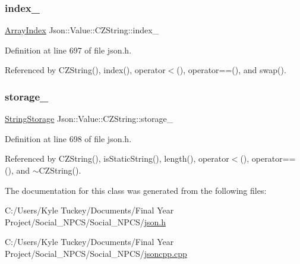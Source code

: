 \mbox{\label{class_json_1_1_value_1_1_c_z_string_aecf29982235c9c165a0971023ebbb270}} 
\subsubsection{\texorpdfstring{index\+\_\+}{index\_}}
{\footnotesize\ttfamily \hyperlink{class_json_1_1_value_a184a91566cccca7b819240f0d5561c7d}{Array\+Index} Json\+::\+Value\+::\+C\+Z\+String\+::index\+\_\+}



Definition at line 697 of file json.\+h.



Referenced by C\+Z\+String(), index(), operator$<$(), operator==(), and swap().

\mbox{\label{class_json_1_1_value_1_1_c_z_string_a17c92f0f089a4314e3b1d5695dc1a851}} 
\subsubsection{\texorpdfstring{storage\+\_\+}{storage\_}}
{\footnotesize\ttfamily \hyperlink{struct_json_1_1_value_1_1_c_z_string_1_1_string_storage}{String\+Storage} Json\+::\+Value\+::\+C\+Z\+String\+::storage\+\_\+}



Definition at line 698 of file json.\+h.



Referenced by C\+Z\+String(), is\+Static\+String(), length(), operator$<$(), operator==(), and $\sim$\+C\+Z\+String().



The documentation for this class was generated from the following files\+:\begin{DoxyCompactItemize}
\item 
C\+:/\+Users/\+Kyle Tuckey/\+Documents/\+Final Year Project/\+Social\+\_\+\+N\+P\+C\+S/\+Social\+\_\+\+N\+P\+C\+S/\hyperlink{json_8h}{json.\+h}\item 
C\+:/\+Users/\+Kyle Tuckey/\+Documents/\+Final Year Project/\+Social\+\_\+\+N\+P\+C\+S/\+Social\+\_\+\+N\+P\+C\+S/\hyperlink{jsoncpp_8cpp}{jsoncpp.\+cpp}\end{DoxyCompactItemize}
